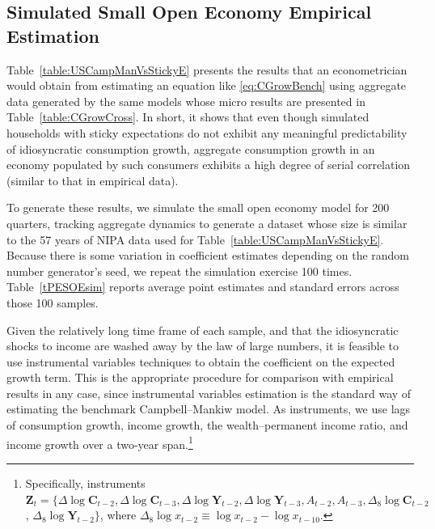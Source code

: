 \documentclass[titlepage]{\econtex}\newcommand{\texname}{cAndCwithStickyE}
\begin{document}
\subsection{Simulated Small Open Economy Empirical Estimation}

Table~\ref{table:USCampManVsStickyE} presents the results that an econometrician would obtain from estimating an equation like \eqref{eq:CGrowBench} using aggregate data generated by the same models whose micro results are presented in Table~\ref{table:CGrowCross}.  In short, it shows that even though simulated households with sticky expectations do not exhibit any meaningful predictability of idiosyncratic consumption growth, aggregate consumption growth in an economy populated by such consumers exhibits a high degree of serial correlation (similar to that in empirical data).

To generate these results, we simulate the small open economy model for 200 quarters, tracking aggregate dynamics to generate a dataset whose size is similar to the 57 years of NIPA data used for Table~\ref{table:USCampManVsStickyE}.  Because there is some variation in coefficient estimates depending on the random number generator's seed, we repeat the simulation exercise 100 times.  Table~\ref{tPESOEsim} reports average point estimates and standard errors across those 100 samples.

Given the relatively long time frame of each sample, and that the idiosyncratic shocks to income are washed away by the law of large numbers, it is feasible to use instrumental variables techniques to obtain the coefficient on the expected growth term.  This is the appropriate procedure for comparison with empirical results in any case, since instrumental variables estimation is the standard way of estimating the benchmark Campbell--Mankiw model.  As instruments, we use lags of consumption growth, income growth, the wealth--permanent income ratio, and income growth over a two-year span.\footnote{Specifically, instruments $\textbf{Z}_t = \{\Delta \log \mathbf{C}_{t-2}, \Delta \log \mathbf{C}_{t-3}, \Delta \log \mathbf{Y}_{t-2}, \Delta \log \mathbf{Y}_{t-3}, A_{t-2}, A_{t-3}, \Delta_8 \log \mathbf{C}_{t-2}$, $\Delta_8 \log \mathbf{Y}_{t-2} \}$, where $\Delta_8 \log x_{t-2}\equiv \log x_{t-2}-\log x_{t-10}$.}
\end{document}
